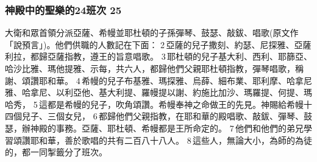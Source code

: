 \subsubsection{神殿中的聖樂的24班次 25}
大衛和眾首領分派亞薩、希幔並耶杜頓的子孫彈琴、鼓瑟、敲鈸、唱歌(原文作「說預言」)。他們供職的人數記在下面： 2 亞薩的兒子撒刻、約瑟、尼探雅、亞薩利拉，都歸亞薩指教，遵王的旨意唱歌。 3 耶杜頓的兒子基大利、西利、耶篩亞、哈沙比雅、瑪他提雅、示每，共六人，都歸他們父親耶杜頓指教，彈琴唱歌，稱謝、頌讚耶和華。 4 希幔的兒子布基雅、瑪探雅、烏薛、細布業、耶利摩、哈拿尼雅、哈拿尼、以利亞他、基大利提、羅幔提以謝、約施比加沙、瑪羅提、何提、瑪哈秀， 5 這都是希幔的兒子，吹角頌讚。希幔奉神之命做王的先見。神賜給希幔十四個兒子、三個女兒， 6 都歸他們父親指教，在耶和華的殿唱歌、敲鈸、彈琴、鼓瑟，辦神殿的事務。亞薩、耶杜頓、希幔都是王所命定的。 7 他們和他們的弟兄學習頌讚耶和華，善於歌唱的共有二百八十八人。 8 這些人，無論大小，為師的為徒的，都一同掣籤分了班次。

